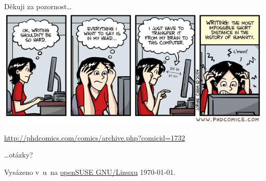 \documentclass[compress, ucs, xelatex, xcolor=dvipsnames, print,
	hyperref={
		bookmarks=true,
		unicode=true,
		colorlinks=true,
		pdftitle={Citacni software},
		plainpages=false,
		pdfauthor={Vojtech Zeisek},
		pdfsubject={Kratky uvod do citacniho software},
		pdfcreator={XeLaTeX},
		pdfkeywords={citace, reference, software, literatura},
		linkcolor=Red,
		anchorcolor=Red,
		citecolor=Green,
		filecolor=Magenta,
		menucolor=Green,
		urlcolor=Cyan,
		pdftex},
	url={hyphens, lowtilde} %
	]{beamer}
\begin{document}
\begin{frame}{Děkuji za pozornost\ldots}
	\includegraphics[width=\textwidth]{phdcomics_writing.png}
	\begin{scriptsize}
		\url{http://phdcomics.com/comics/archive.php?comicid=1732}
	\end{scriptsize}
	\begin{flushright}
		\ldots otázky?
	\end{flushright}
	\begin{tiny}
		Vysázeno v~\XeLaTeX u~na \href{https://www.opensuse.org/}{openSUSE GNU/Linuxu} \today.
	\end{tiny}
\end{frame}
\end{document}
